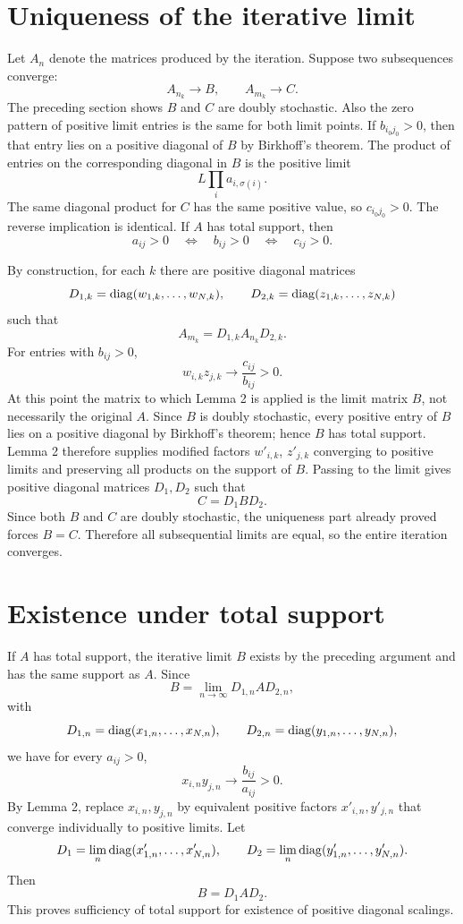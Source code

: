 \section{Uniqueness of the iterative limit}
Let \(A_n\) denote the matrices produced by the iteration.  Suppose two subsequences converge:
\[
  A_{n_k}\to B,
  \qquad
  A_{m_k}\to C.
\]
The preceding section shows \(B\) and \(C\) are doubly stochastic.  Also the zero pattern of positive limit entries is the same for both limit points.  If \(b_{i_0j_0}>0\), then that entry lies on a positive diagonal of \(B\) by Birkhoff's theorem.  The product of entries on the corresponding diagonal in \(B\) is the positive limit
\[
  L\prod_i a_{i,\sigma(i)}.
\]
The same diagonal product for \(C\) has the same positive value, so \(c_{i_0j_0}>0\).  The reverse implication is identical.  If \(A\) has total support, then
\[
  a_{ij}>0\quad\Longleftrightarrow\quad b_{ij}>0\quad\Longleftrightarrow\quad c_{ij}>0.
\]

By construction, for each \(k\) there are positive diagonal matrices
\[
  D_{1,k}=\operatorname{diag}(w_{1,k},\ldots,w_{N,k}),
  \qquad
  D_{2,k}=\operatorname{diag}(z_{1,k},\ldots,z_{N,k})
\]
such that
\[
  A_{m_k}=D_{1,k}A_{n_k}D_{2,k}.
\]
For entries with \(b_{ij}>0\),
\[
  w_{i,k}z_{j,k}\to \frac{c_{ij}}{b_{ij}}>0.
\]
At this point the matrix to which Lemma 2 is applied is the limit matrix \(B\), not necessarily the original \(A\).  Since \(B\) is doubly stochastic, every positive entry of \(B\) lies on a positive diagonal by Birkhoff's theorem; hence \(B\) has total support.  Lemma 2 therefore supplies modified factors \(w'_{i,k}\), \(z'_{j,k}\) converging to positive limits and preserving all products on the support of \(B\).  Passing to the limit gives positive diagonal matrices \(D_1,D_2\) such that
\[
  C=D_1BD_2.
\]
Since both \(B\) and \(C\) are doubly stochastic, the uniqueness part already proved forces \(B=C\).  Therefore all subsequential limits are equal, so the entire iteration converges.

\section{Existence under total support}
If \(A\) has total support, the iterative limit \(B\) exists by the preceding argument and has the same support as \(A\).  Since
\[
  B=\lim_{n\to\infty}D_{1,n}AD_{2,n},
\]
with
\[
  D_{1,n}=\operatorname{diag}(x_{1,n},
\ldots,x_{N,n}),
  \qquad
  D_{2,n}=\operatorname{diag}(y_{1,n},
\ldots,y_{N,n}),
\]
we have for every \(a_{ij}>0\),
\[
  x_{i,n}y_{j,n}\to \frac{b_{ij}}{a_{ij}}>0.
\]
By Lemma 2, replace \(x_{i,n},y_{j,n}\) by equivalent positive factors \(x'_{i,n},y'_{j,n}\) that converge individually to positive limits.  Let
\[
  D_1=\lim_n \operatorname{diag}(x'_{1,n},
\ldots,x'_{N,n}),
  \qquad
  D_2=\lim_n \operatorname{diag}(y'_{1,n},
\ldots,y'_{N,n}).
\]
Then
\[
  B=D_1AD_2.
\]
This proves sufficiency of total support for existence of positive diagonal scalings.

